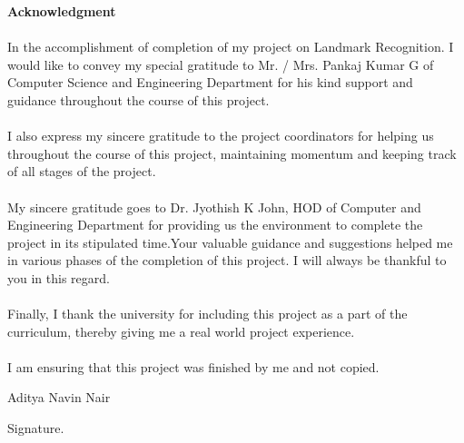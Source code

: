 \documentclass[10pt]{article} %
\begin{document}
\begin{Center}



            \textbf{\Large Acknowledgment}

\vspace{30mm}
 
\begin{spacing}{1.5}
\paragraph{}
\justifying
In the accomplishment of completion of my project on Landmark Recognition. I would like to convey my special gratitude to Mr. / Mrs. Pankaj Kumar G of Computer Science and Engineering Department for his kind support and guidance throughout the course of this project.
\paragraph{}
\justifying
I also express my sincere gratitude to the project coordinators for helping us throughout the course of this project, maintaining momentum and keeping track of all stages of the project.

\paragraph{}
\justifying
My sincere gratitude goes to Dr. Jyothish K John, HOD of Computer and Engineering Department for providing us the environment to complete the project in its stipulated time.Your valuable guidance and suggestions helped me in various phases of the completion of this project. I will always be thankful to you in this regard.
\paragraph{}
\justifying
Finally, I thank the university for including this project as a part of the curriculum, thereby giving me a real world project experience.
\paragraph{}
\end{spacing}
\justifying
I am ensuring that this project was finished by me and not copied.

\vspace{10mm}

\hspace{80mm} Aditya Navin Nair

\vspace{15mm} 

\hspace{95mm} Signature.
\end{Center}
\newpage
\end{document}

